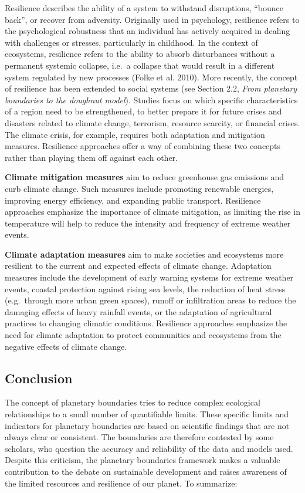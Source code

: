 \documentclass[
  a4paper,
  DIV=11,
  numbers=noendperiod,
  oneside,
  openany]{scrreprt}
\begin{document}
Resilience describes the ability of a system to withstand disruptions,
``bounce back'', or recover from adversity. Originally used in
psychology, resilience refers to the psychological robustness that an
individual has actively acquired in dealing with challenges or stresses,
particularly in childhood. In the context of ecosystems, resilience
refers to the ability to absorb disturbances without a permanent
systemic collapse, i.e.~a collapse that would result in a different
system regulated by new processes (Folke et al. 2010). More recently,
the concept of resilience has been extended to social systems (see
Section 2.2, \emph{From planetary boundaries to the doughnut model}).
Studies focus on which specific characteristics of a region need to be
strengthened, to better prepare it for future crises and disasters
related to climate change, terrorism, resource scarcity, or financial
crises. The climate crisis, for example, requires both adaptation and
mitigation measures. Resilience approaches offer a way of combining
these two concepts rather than playing them off against each other.

\textbf{Climate mitigation measures} aim to reduce greenhouse gas
emissions and curb climate change. Such measures include promoting
renewable energies, improving energy efficiency, and expanding public
transport. Resilience approaches emphasize the importance of climate
mitigation, as limiting the rise in temperature will help to reduce the
intensity and frequency of extreme weather events.

\textbf{Climate adaptation measures} aim to make societies and
ecosystems more resilient to the current and expected effects of climate
change. Adaptation measures include the development of early warning
systems for extreme weather events, coastal protection against rising
sea levels, the reduction of heat stress (e.g.~through more urban green
spaces), runoff or infiltration areas to reduce the damaging effects of
heavy rainfall events, or the adaptation of agricultural practices to
changing climatic conditions. Resilience approaches emphasize the need
for climate adaptation to protect communities and ecosystems from the
negative effects of climate change.

\subsection{Conclusion}\label{conclusion}

The concept of planetary boundaries tries to reduce complex ecological
relationships to a small number of quantifiable limits. These specific
limits and indicators for planetary boundaries are based on scientific
findings that are not always clear or consistent. The boundaries are
therefore contested by some scholars, who question the accuracy and
reliability of the data and models used. Despite this criticism, the
planetary boundaries framework makes a valuable contribution to the
debate on sustainable development and raises awareness of the limited
resources and resilience of our planet. To summarize:
\end{document}
